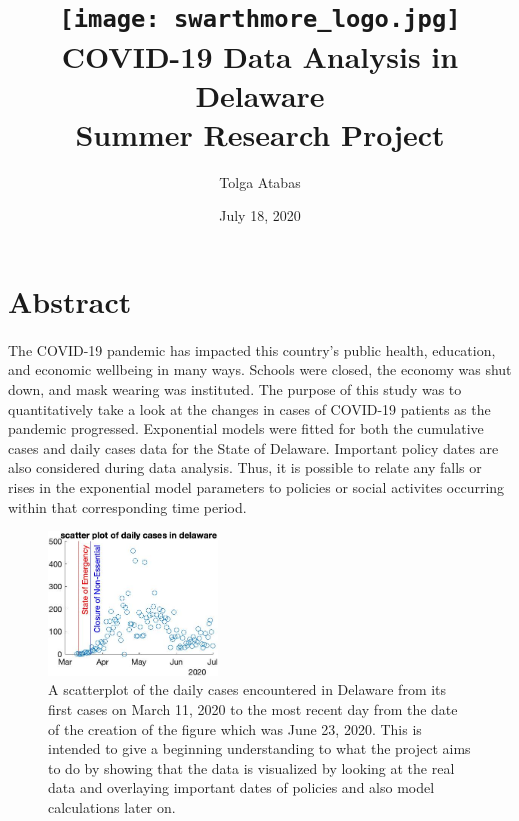 \documentclass[12pt]{article}
\begin{document}
\author{Tolga Atabas}
\title{\texttt{[image: swarthmore\_logo.jpg]} \\ COVID-19 Data Analysis in Delaware \\ Summer Research Project}
\date{July 18, 2020}

\maketitle{} %
\tableofcontents{} %

\thispagestyle{empty}
\clearpage
\setcounter{page}{1}

\section{Abstract}
\paragraph{}
The COVID-19 pandemic has impacted this country’s public health, education, and economic wellbeing in many ways. Schools were closed, the economy was shut down, and mask wearing was instituted. The purpose of this study was to quantitatively take a look at the changes in cases of COVID-19 patients as the pandemic progressed. Exponential models were fitted for both the cumulative cases and daily cases data for the State of Delaware. Important policy dates are also considered during data analysis. Thus, it is possible to relate any falls or rises in the exponential model parameters to policies or social activites occurring within that corresponding time period.
\vspace{3cm}
\begin{figure}[h]
\centering
\includegraphics[width=0.4\textwidth]{Figure1.jpg}
\caption{A scatterplot of the daily cases encountered in Delaware from its first cases on March 11, 2020 to the most recent day from the date of the creation of the figure which was June 23, 2020. This is intended to give a beginning understanding to what the project aims to do by showing that the data is visualized by looking at the real data and overlaying important dates of policies and also model calculations later on.}
\end{figure}
\end{document}
